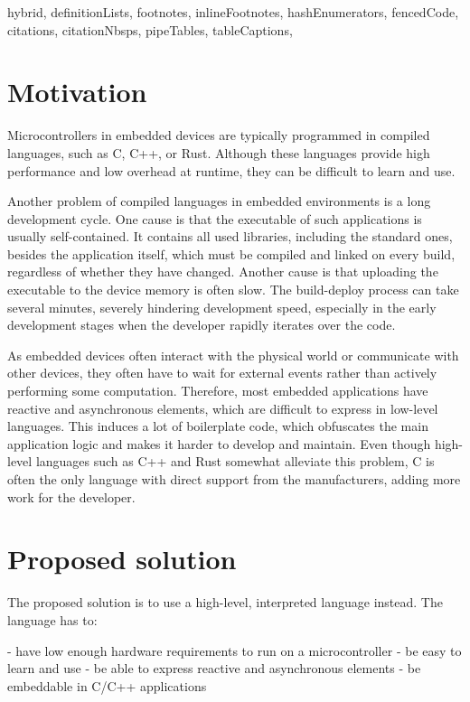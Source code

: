 \documentclass[
  digital,
  oneside,
  nosansbold,
  nocolorbold,
  lof,
  lot
]{fithesis4}
\begin{document}
\begin{markdown*}{%
  hybrid,
  definitionLists,
  footnotes,
  inlineFootnotes,
  hashEnumerators,
  fencedCode,
  citations,
  citationNbsps,
  pipeTables,
  tableCaptions,
}

\chapter{Motivation}

Microcontrollers in embedded devices are typically programmed in compiled languages, such as C, C++, or Rust. Although these languages provide high performance and low overhead at runtime, they can be difficult to learn and use.

Another problem of compiled languages in embedded environments is a long development cycle. One cause is that the executable of such applications is usually self-contained. It contains all used libraries, including the standard ones, besides the application itself, which must be compiled and linked on every build, regardless of whether they have changed. Another cause is that uploading the executable to the device memory is often slow. The build-deploy process can take several minutes, severely hindering development speed, especially in the early development stages when the developer rapidly iterates over the code.

As embedded devices often interact with the physical world or communicate with other devices, they often have to wait for external events rather than actively performing some computation. Therefore, most embedded applications have reactive and asynchronous elements, which are difficult to express in low-level languages. This induces a lot of boilerplate code, which obfuscates the main application logic and makes it harder to develop and maintain. Even though high-level languages such as C++ and Rust somewhat alleviate this problem, C is often the only language with direct support from the manufacturers, adding more work for the developer.

\chapter{Proposed solution}

The proposed solution is to use a high-level, interpreted language instead. The language has to:

  - have low enough hardware requirements to run on a microcontroller
  - be easy to learn and use
  - be able to express reactive and asynchronous elements
  - be embeddable in C/C++ applications


\end{markdown*}
\end{document}
